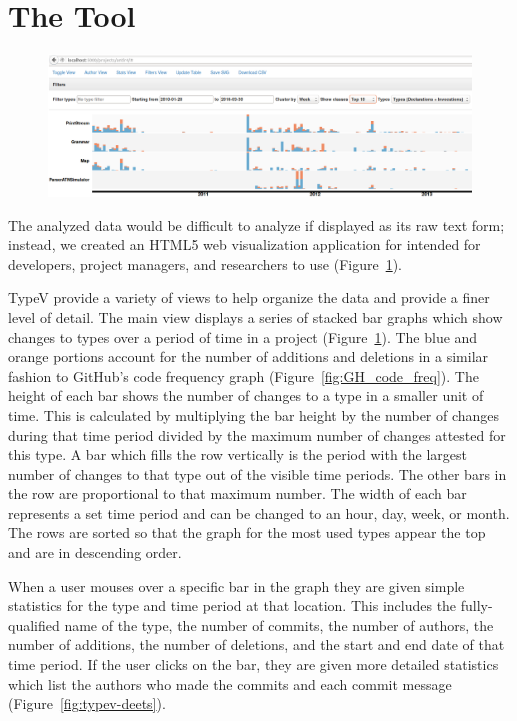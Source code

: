 \documentclass[conference]{IEEEtran}
\begin{document}
\section{The Tool}

\begin{figure}[!t]
\centering
\includegraphics[width=\textwidth]{Screenshot_antlr4}
\caption{}
\label{fig:main-view}
\end{figure}

The analyzed data would be difficult to analyze if displayed as its raw text form; instead, we created an HTML5 web visualization application for intended for developers, project managers, and researchers to use (Figure~\ref{fig:main-view}).

TypeV provide a variety of views to help organize the data and provide a finer level of detail. The main view displays a series of stacked bar graphs which show changes to types over a period of time in a project (Figure~\ref{fig:main-view}). The blue and orange portions account for the number of additions and deletions in a similar fashion to GitHub’s code frequency graph (Figure~\ref{fig:GH_code_freq}). The height of each bar shows the number of changes to a type in a smaller unit of time. This is calculated by multiplying the bar height by the number of changes during that time period divided by the maximum number of changes attested for this type. A bar which fills the row vertically is the period with the largest number of changes to that type out of the visible time periods. The other bars in the row are proportional to that maximum number. The width of each bar represents a set time period and can be changed to an hour, day, week, or month. The rows are sorted so that the graph for the most used types appear the top and are in descending order.

When a user mouses over a specific bar in the graph they are given simple statistics for the type and time period at that location. This includes the fully-qualified name of the type, the number of commits, the number of authors, the number of additions, the number of deletions, and the start and end date of that time period. If the user clicks on the bar, they are given more detailed statistics which list the authors who made the commits and each commit message (Figure~\ref{fig:typev-deets}).
\end{document}
